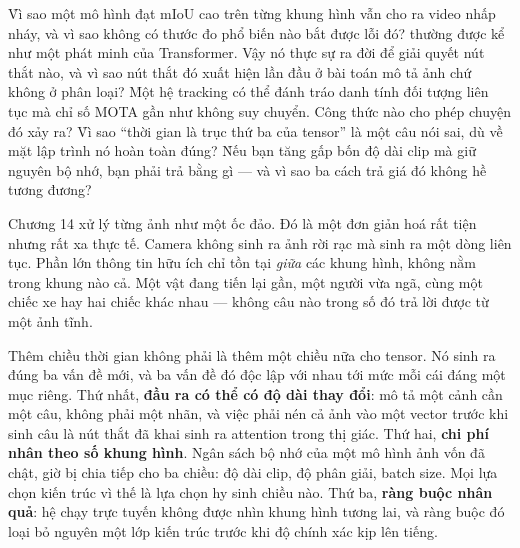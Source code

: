 \documentclass[../../deep_learning.tex]{subfiles}
\begin{document}
\begin{khoigoi}
\h{Vì sao một mô hình đạt mIoU cao trên từng khung hình vẫn cho ra video nhấp nháy, và vì sao không có thước đo phổ biến nào bắt được lỗi đó?}
\h{ thường được kể như một phát minh của Transformer. Vậy nó thực sự ra đời để giải quyết nút thắt nào, và vì sao nút thắt đó xuất hiện lần đầu ở bài toán mô tả ảnh chứ không ở phân loại?}
\h{Một hệ tracking có thể đánh tráo danh tính đối tượng liên tục mà chỉ số MOTA gần như không suy chuyển. Công thức nào cho phép chuyện đó xảy ra?}
\h{Vì sao ``thời gian là trục thứ ba của tensor'' là một câu nói sai, dù về mặt lập trình nó hoàn toàn đúng?}
\h{Nếu bạn tăng gấp bốn độ dài clip mà giữ nguyên bộ nhớ, bạn phải trả bằng gì --- và vì sao ba cách trả giá đó không hề tương đương?}
\end{khoigoi}

Chương 14 xử lý từng ảnh như một ốc đảo. Đó là một đơn giản hoá rất tiện nhưng rất xa thực tế. Camera không sinh ra ảnh rời rạc mà sinh ra một dòng liên tục. Phần lớn thông tin hữu ích chỉ tồn tại \emph{giữa} các khung hình, không nằm trong khung nào cả. Một vật đang tiến lại gần, một người vừa ngã, cùng một chiếc xe hay hai chiếc khác nhau --- không câu nào trong số đó trả lời được từ một ảnh tĩnh.

Thêm chiều thời gian không phải là thêm một chiều nữa cho tensor. Nó sinh ra đúng ba vấn đề mới, và ba vấn đề đó độc lập với nhau tới mức mỗi cái đáng một mục riêng. Thứ nhất, \textbf{đầu ra có thể có độ dài thay đổi}: mô tả một cảnh cần một câu, không phải một nhãn, và việc phải nén cả ảnh vào một vector trước khi sinh câu là nút thắt đã khai sinh ra attention trong thị giác. Thứ hai, \textbf{chi phí nhân theo số khung hình}. Ngân sách bộ nhớ của một mô hình ảnh vốn đã chật, giờ bị chia tiếp cho ba chiều: độ dài clip, độ phân giải, batch size. Mọi lựa chọn kiến trúc vì thế là lựa chọn hy sinh chiều nào. Thứ ba, \textbf{ràng buộc nhân quả}: hệ chạy trực tuyến không được nhìn khung hình tương lai, và ràng buộc đó loại bỏ nguyên một lớp kiến trúc trước khi độ chính xác kịp lên tiếng.
\end{document}
